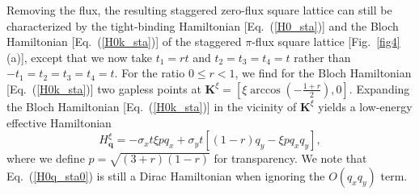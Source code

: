 \documentclass[aps, twocolumn, floatfix, superscriptaddress, prb]{revtex4-1}
\begin{document}
{Removing the flux, the resulting staggered zero-flux square lattice can still be characterized by the tight-binding Hamiltonian [Eq.~(\ref{H0_sta})] and the Bloch Hamiltonian [Eq.~(\ref{H0k_sta})] of the staggered $\pi$-flux square lattice [Fig.~\ref{fig4}(a)], except that we now take $t_1=rt$ and $t_2=t_3=t_4=t$ rather than $-t_1=t_2=t_3=t_4=t$. For the ratio $0\leq r<1$, we find for the Bloch Hamiltonian [Eq.~(\ref{H0k_sta})] two gapless points at ${\bm K}^\xi=[\xi\arccos(-\frac{1+r}{2}),0]$. Expanding the Bloch Hamiltonian [Eq.~(\ref{H0k_sta})] in the vicinity of ${\bm K}^\xi$ yields a low-energy effective Hamiltonian
}
%
%
\begin{equation}\label{H0q_sta0}
{
H_{\bm q}^\xi = -\sigma_xt \xi p q_x +\sigma_y t \left[ (1-r)q_y  -\xi p q_xq_y \right],
}
\end{equation}
%
where we define $p=\sqrt{(3+r)(1-r)}$ for transparency. We note that Eq.~(\ref{H0q_sta0}) is still a Dirac Hamiltonian when ignoring the $O(q_xq_y)$ term.
\end{document}
